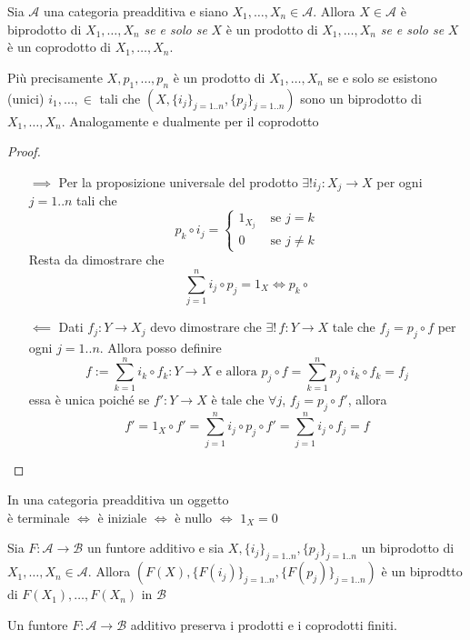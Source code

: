 \begin{proposition}{}
    Sia \(\mathcal{A}\) una categoria preadditiva e siano \(X_{1}, \dots, X_{n} \in \mathcal{A}\).
    Allora \(X \in \mathcal{A}\) è biprodotto di \(X_{1}, \dots, X_{n}\) \emph{se e solo se} \(X\) è un prodotto di \(X_{1}, \dots, X_{n}\) \emph{se e solo se }\(X\) è
    un coprodotto di \(X_{1}, \dots, X_{n}\).

    Più precisamente \(X, p_{1}, \dots, p_{n}\) è un prodotto di \(X_{1}, \dots, X_{n}\) se e solo se esistono (unici) \(i_{1},\dots, \in \) tali che \({(X, \{i_j\}_{j=1. .n}, \{p_{j}\}_{j = 1. .n}  )}\) sono un biprodotto di \(X_{1}, \dots, X_{n}\).
    Analogamente e dualmente per il coprodotto
\end{proposition}
\begin{proof}\( \)
\begin{itemize}
    \item[\(\implies \)] Per la proposizione universale del prodotto \(\exists ! i_j : X_j \to X\) per ogni \(j=1 . .n\) tali che
        \[
          p_k \circ i_j = \begin{cases}{}
              1_{X_j} & \text{ se } j = k \\
              0 & \text{ se } j\neq k
          \end{cases}
        \]
        Resta da dimostrare che 
        \[
          \sum_{j=1}^{n} i_{j} \circ p_j = 1_X \iff p_k \circ  
        \]
    \item[\(\impliedby \)] Dati \(f_{j} : Y \to X_j \) devo dimostrare che \(\exists  ! \, f : Y \to X\) tale che \(f_j = p_j \circ f\) per ogni \(j = 1..n\). Allora posso definire
        \[
          f := \sum_{k=1}^{n} i_k \circ f_k : Y \to  X \text{ e allora } p_j
          \circ f = \sum_{k=1}^{n} p_j \circ i_k \circ f_k = f_j 
        \]
        essa è unica poiché se \(f' : Y\to X\) è tale che \(\forall j\), \(f_j = p_j \circ f'\),
        allora \[f' = 1_X \circ f' = \sum_{j=1}^{n} i_j \circ p_j \circ f' = \sum_{j=1}^{n} i_j \circ f_j = f\] 
\end{itemize}
\end{proof}
\begin{remark}[\(n =0\) ]
    In una categoria preadditiva un oggetto \\ è terminale \(\iff\)  è iniziale \(\iff\) è nullo \(\iff\) \(1_X = 0\) 
\end{remark}

\begin{remark}{}
    Sia \(F : \mathcal{A} \to \mathcal{B}\) un funtore additivo e sia \(X, \{i_{j}\}_{j = 1. .n}, \{p_{j}\} _{j = 1. .n}  \) un biprodotto di \(X_{1}, \dots, X_{n} \in \mathcal{A}\). Allora 
    \({(F{(X)}, \{F{(i_{j})}\}_{j=1. .n}, \{F{(p_{j})}\} _{j=1. .n}  )}\) è un
    biprodtto di \(F{(X_{1})}, \dots, F{(X_{n})}\) in \(\mathcal{B}\) 
\end{remark}
\begin{corollary}{}
    Un funtore \(F: \mathcal{A} \to \mathcal{B}\) additivo preserva i prodotti e
    i coprodotti finiti.
\end{corollary}

